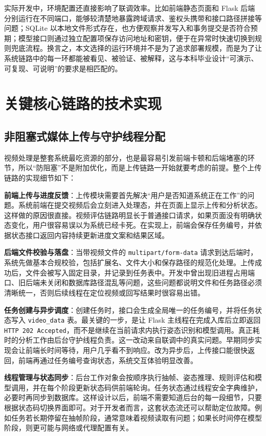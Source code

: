 \documentclass[UTF8,twoside]{ctexrep}
\makeatletter
\def@NAT@last@yr{\@citea}%
\def@NAT@last@yr{-\NAT@penalty}%
\makeatother
\begin{document}
实际开发中，环境配置还直接影响了联调效率。比如前端静态页面和 Flask 后端分别运行在不同端口，能够较清楚地暴露跨域请求、鉴权头携带和接口路径拼接等问题；SQLite 以本地文件形式存在，也方便观察并发写入和事务提交是否符合预期；模型接口则通过独立配置项保存访问地址和密钥，便于在异常时快速切换到规则兜底流程。换言之，本文选择的运行环境并不是为了追求部署规模，而是为了让系统链路中的每一环都能被看见、被验证、被解释，这与本科毕业设计“可演示、可复现、可说明”的要求是相匹配的。

\section{关键核心链路的技术实现}

\subsection{非阻塞式媒体上传与守护线程分配}
视频处理是整套系统最吃资源的部分，也是最容易引发前端卡顿和后端堵塞的环节，所以“防阻塞”不是附加优化，而是上传链路一开始就要考虑的前提。整个上传链路的实现细节如下：

\textbf{前端上传与进度反馈}：上传模块需要首先解决“用户是否知道系统正在工作”的问题。系统前端在提交视频后会立刻进入处理态，并在页面上显示上传和分析状态。这样做的原因很直接。视频评估链路明显长于普通接口请求，如果页面没有明确状态变化，用户很容易误以为系统已经卡死。在实现上，前端会保存任务编号，并依据状态接口返回内容持续更新进度文案和结果区域。

\textbf{后端文件校验与落盘}：当带视频文件的 \texttt{multipart/form-data} 请求到达后端时，系统先做基本合规校验，包括扩展名、文件大小和保存路径的规范化处理。上传成功后，文件会被写入固定目录，并记录到任务表中。开发中曾出现旧进程占用端口、旧后端未关闭和数据库路径混乱等问题，这些问题都说明文件和任务路径必须清晰统一，否则后续线程在定位视频或回写结果时很容易出错。

\textbf{任务创建与异步调度}：创建任务时，接口会生成全局唯一的任务编号，并将任务状态写入 \texttt{video\_data} 表。最关键的一步，是让 Flask 主线程在完成入库后立即返回 \texttt{HTTP 202 Accepted}，而不是继续在当前请求内执行姿态识别和模型调用。真正耗时的分析工作由后台守护线程负责。这一改动来自联调中的真实问题。早期同步实现会让前端长时间等待，用户几乎看不到响应。改为异步后，上传接口能很快返回，前端再通过任务编号查询状态，系统交互体验明显改善。

\textbf{线程管理与状态同步}：后台工作对象会按顺序执行抽帧、姿态推理、规则评估和模型调用，并在每个阶段更新状态码供前端轮询。任务状态通过线程安全字典维护，必要时再同步到数据库。这样设计以后，前端不需要知道后台的每一段细节，只要根据状态码切换界面即可。对于开发者而言，这套状态流还可以帮助定位故障。例如任务若长期停留在抽帧阶段，通常意味着视频读取有问题；如果长时间停在模型阶段，则更可能与网络或代理配置有关。
\end{document}

